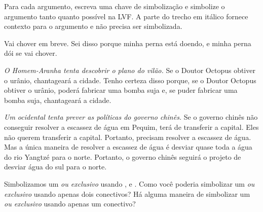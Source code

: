\problempart
Para cada argumento, escreva uma chave de simbolização e simbolize o argumento tanto quanto possível na LVF. A parte do trecho em itálico fornece contexto para o argumento e não precisa ser simbolizada.
\begin{compactlist}
\item Vai chover em breve. Sei disso porque minha perna está doendo, e minha perna dói se vai chover.

\item \emph{O Homem-Aranha tenta descobrir o plano do vilão.} Se o Doutor Octopus obtiver o urânio, chantageará a cidade. Tenho certeza disso porque, se o Doutor Octopus obtiver o urânio, poderá fabricar uma bomba suja e, se puder fabricar uma bomba suja, chantageará a cidade.

\item \emph{Um ocidental tenta prever as políticas do governo chinês.} Se o governo chinês não conseguir resolver a escassez de água em Pequim, terá de transferir a capital. Eles não querem transferir a capital. Portanto, precisam resolver a escassez de água. Mas a única maneira de resolver a escassez de água é desviar quase toda a água do rio Yangtzé para o norte. Portanto, o governo chinês seguirá o projeto de desviar água do sul para o norte.

\end{compactlist}

\problempart
Simbolizamos um \emph{ou exclusivo} usando \eor, \eand e \enot. Como você poderia simbolizar um \emph{ou exclusivo} usando apenas dois conectivos? Há alguma maneira de simbolizar um \emph{ou exclusivo} usando apenas um conectivo?
\\

